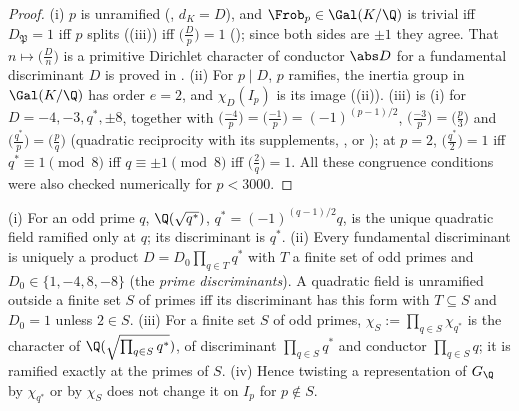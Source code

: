 \begin{proof}
(i) $p$ is unramified (, $d_K=D$), and $\Frob_p\in\Gal(K/\Q)$ is trivial iff $D_{\mathfrak P}=1$ iff $p$ splits
((iii)) iff $\bigl(\frac Dp\bigr)=1$ (); since both sides are $\pm1$ they agree. That $n\mapsto\bigl(\frac Dn\bigr)$ is a
primitive Dirichlet character of conductor $\abs D$ for a fundamental discriminant $D$ is proved in . (ii) For $p\mid D$, $p$ ramifies, the inertia
group in $\Gal(K/\Q)$ has order $e=2$, and $\chi_D(I_p)$ is its image ((ii)). (iii) is (i) for $D=-4,-3,q^*,\pm8$, together with
$\bigl(\frac{-4}p\bigr)=\bigl(\frac{-1}p\bigr)=(-1)^{(p-1)/2}$, $\bigl(\frac{-3}p\bigr)=\bigl(\frac p3\bigr)$ and $\bigl(\frac{q^*}p\bigr)=\bigl(\frac pq\bigr)$ (quadratic reciprocity with its
supplements, , or ); at $p=2$, $\bigl(\frac{q^*}2\bigr)=1$ iff $q^*\equiv1\pmod8$ iff $q\equiv\pm1\pmod8$ iff $\bigl(\frac2q\bigr)=1$. All
these congruence conditions were also checked numerically for $p<3000$.
\end{proof}

\begin{proposition}\label{prop:ant:ramonlyat}
(i) For an odd prime $q$, $\Q(\sqrt{q^*})$, $q^*=(-1)^{(q-1)/2}q$, is the unique quadratic field ramified only at $q$; its discriminant is $q^*$.
(ii) Every fundamental discriminant is uniquely a product $D=D_0\prod_{q\in T}q^*$ with $T$ a finite set of odd primes and $D_0\in\{1,-4,8,-8\}$ (the
\emph{prime discriminants}). A quadratic field is unramified outside a finite set $S$ of primes iff its discriminant has this form with $T\subseteq S$ and
$D_0=1$ unless $2\in S$.
(iii) For a finite set $S$ of odd primes, $\chi_S:=\prod_{q\in S}\chi_{q^*}$ is the character of $\Q(\sqrt{\prod_{q\in S}q^*})$, of discriminant
$\prod_{q\in S}q^*$ and conductor $\prod_{q\in S}q$; it is ramified exactly at the primes of $S$.
(iv) Hence twisting a representation of $G_\Q$ by $\chi_{q^*}$ or by $\chi_S$ does not change it on $I_p$ for $p\notin S$.
\end{proposition}

